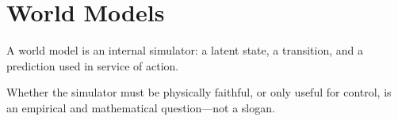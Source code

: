 \chapter{World Models}
\label{ch:world-models}

A world model is an internal simulator: a latent state, a transition, and a prediction used in service of action.

Whether the simulator must be physically faithful, or only useful for control, is an empirical and mathematical question---not a slogan.
